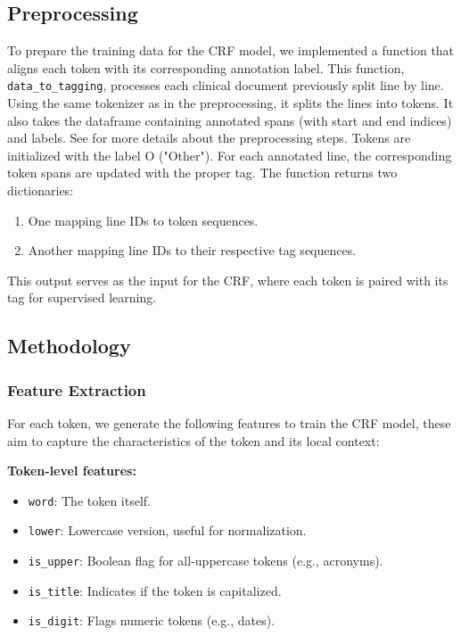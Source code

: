 \documentclass[9pt,a4paper,twoside]{tau-class/tau}
\begin{document}
        \subsection{Preprocessing}
        To prepare the training data for the CRF model, we implemented a function that aligns each token with its corresponding annotation label. This function, \lstinline|data_to_tagging|, processes each clinical document previously split line by line. Using the same tokenizer as in the preprocessing, it splits the lines into tokens. It also takes the dataframe containing annotated spans (with start and end indices) and labels. See  for more details about the preprocessing steps.
        Tokens are initialized with the label O ("Other"). For each annotated line, the corresponding token spans are updated with the proper tag. The function returns two dictionaries:
        \begin{enumerate}
            \item One mapping line IDs to token sequences.
            \item Another mapping line IDs to their respective tag sequences.
        \end{enumerate}
        
        This output serves as the input for the CRF, where each token is paired with its tag for supervised learning.

        
    \subsection{Methodology}
        \subsubsection{Feature Extraction}
        For each token, we generate the following features to train the CRF model, these aim to capture the characteristics of the token and its local context:

\textbf{Token-level features:}
    \begin{itemize}
        \item \texttt{word}: The token itself.
        \item \texttt{lower}: Lowercase version, useful for normalization.
        \item \texttt{is\_upper}: Boolean flag for all-uppercase tokens (e.g., acronyms).
        \item \texttt{is\_title}: Indicates if the token is capitalized.
        \item \texttt{is\_digit}: Flags numeric tokens (e.g., dates).
    \end{itemize}
    
\end{document}
